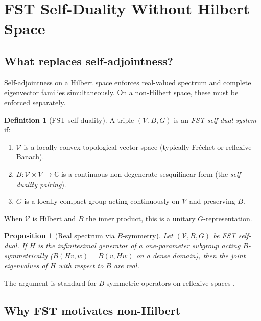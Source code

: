 \documentclass[11pt,a4paper]{article}
\theoremstyle{plain}
\newtheorem{proposition}[theorem]{Proposition}
\theoremstyle{definition}
\newtheorem{definition}[theorem]{Definition}
\newcommand{\C}{\mathbb{C}}
\newcommand{\V}{\mathcal{V}}
\begin{document}
\section{FST Self-Duality Without Hilbert Space}
\label{sec:fst-duality}

\subsection{What replaces self-adjointness?}

Self-adjointness on a Hilbert space enforces real-valued spectrum
and complete eigenvector families simultaneously.  On a non-Hilbert
space, these must be enforced separately.

\begin{definition}[FST self-duality]
\label{def:fst-duality}
A triple $(\V, B, G)$ is an \emph{FST self-dual system} if:
\begin{enumerate}[leftmargin=*]
  \item $\V$ is a locally convex topological vector space (typically
    Fr\'echet or reflexive Banach).
  \item $B: \V \times \V \to \C$ is a continuous non-degenerate
    sesquilinear form (the \emph{self-duality pairing}).
  \item $G$ is a locally compact group acting continuously on $\V$
    and preserving $B$.
\end{enumerate}
\end{definition}

When $\V$ is Hilbert and $B$ the inner product, this is a unitary
$G$-representation.

\begin{proposition}[Real spectrum via $B$-symmetry]
\label{prop:real-spectrum}
Let $(\V, B, G)$ be FST self-dual.  If $H$ is the infinitesimal
generator of a one-parameter subgroup acting $B$-symmetrically
($B(Hv, w) = B(v, Hw)$ on a dense domain), then the joint eigenvalues
of $H$ with respect to $B$ are real.
\end{proposition}

The argument is standard for $B$-symmetric operators on reflexive
spaces \cite{Meyer2005}.

\subsection{Why FST motivates non-Hilbert}
\end{document}

